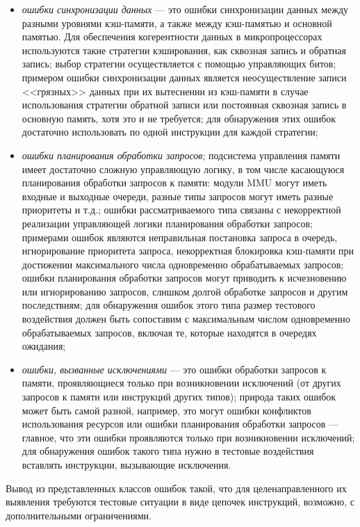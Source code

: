 \begin{itemize}
  \item \emph{ошибки синхронизации данных} --- это ошибки синхронизации данных между разными уровнями кэш-памяти, а также между кэш-памятью и основной памятью. Для обеспечения когерентности данных в микропроцессорах используются такие стратегии кэширования, как сквозная запись и обратная запись; выбор стратегии осуществляется с помощью управляющих битов; примером ошибки синхронизации данных является неосуществление записи <<грязных>> данных при их вытеснении из кэш-памяти в случае использования стратегии обратной записи или постоянная сквозная запись в основную память, хотя это и не требуется; для обнаружения этих ошибок достаточно использовать по одной инструкции для каждой стратегии;
  \item \emph{ошибки планирования обработки запросов}; подсистема управления памяти имеет достаточно сложную управляющую логику, в том числе касающуюся планирования обработки запросов к памяти: модули MMU могут иметь входные и выходные очереди, разные типы запросов могут иметь разные приоритеты и т.д.; ошибки рассматриваемого типа связаны с некорректной реализации управляющей логики планирования обработки запросов; примерами ошибок являются неправильная постановка запроса в очередь, игнорирование приоритета запроса, некорректная блокировка кэш-памяти при достижении максимального числа одновременно обрабатываемых запросов; ошибки планирования обработки запросов могут приводить к исчезновению или игнорированию запросов, слишком долгой обработке запросов и другим последствиям; для обнаружения ошибок этого типа размер тестового воздействия должен быть сопоставим с максимальным числом одновременно обрабатываемых запросов, включая те, которые находятся в очередях ожидания;
  \item \emph{ошибки, вызванные исключениями} --- это ошибки обработки запросов к памяти, проявляющиеся только при возникновении исключений (от других запросов к памяти или инструкций других типов); природа таких ошибок может быть самой разной, например, это могут ошибки конфликтов использования ресурсов или ошибки планирования обработки запросов --- главное, что эти ошибки проявляются только при возникновении исключений; для обнаружения ошибок такого типа нужно в тестовые воздействия вставлять инструкции, вызывающие исключения.
\end{itemize}

Вывод из представленных классов ошибок такой, что для целенаправленного их выявления требуются тестовые ситуации в виде цепочек инструкций, возможно, с дополнительными ограничениями.

